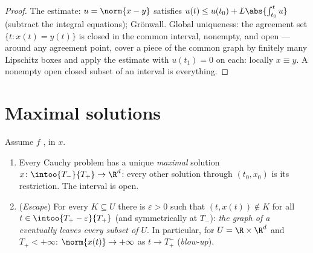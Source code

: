 \begin{proof}
The estimate: $u = \norm{x - y}$ satisfies $u(t) \leq u(t_0)
+ L\abs{\int_{t_0}^tu}$ (subtract the integral equations);
Gr\"onwall. Global uniqueness: the agreement set $\{t : x(t)
= y(t)\}$ is closed in the common interval, nonempty, and
open --- around any agreement point, cover a  piece of
the common graph by finitely many Lipschitz boxes and apply
the estimate with $u(t_1) = 0$ on each: locally $x \equiv y$.
A nonempty open closed subset of an interval is everything.
\end{proof}

\section{Maximal solutions}

\begin{theorem}
\label{thm:b3:ode:maximal}
Assume $f$ ,  in $x$.
\begin{enumerate}
  \item Every Cauchy problem has a unique \emph{maximal}
        solution $x \colon \intoo{T_-}{T_+} \to \R^d$: every
        other solution through $(t_0, x_0)$ is its
        restriction. The interval is open.
  \item (\emph{Escape}) For every  $K \subseteq U$
        there is $\varepsilon > 0$ such that $(t, x(t)) \notin
        K$ for all $t \in \intoo{T_+ - \varepsilon}{T_+}$ (and
        symmetrically at $T_-$): \emph{the graph of a  eventually leaves every  subset of
        $U$}. In particular,
        for $U = \R\times\R^d$ and $T_+ < +\infty$:
        $\norm{x(t)} \to +\infty$ as $t \to T_+^-$
        (\emph{blow-up}).
\end{enumerate}
\end{theorem}

